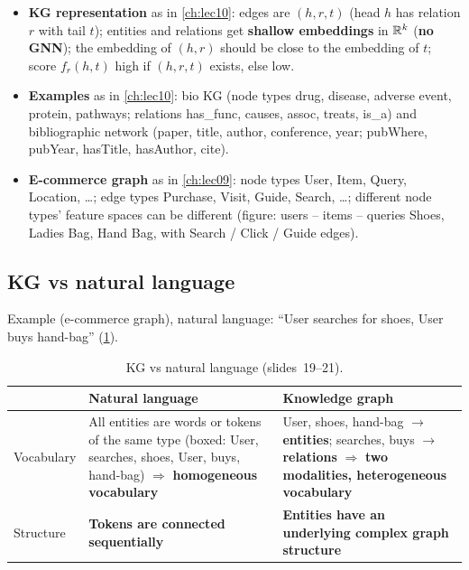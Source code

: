 \begin{itemize}
  \item \textbf{KG representation} as in \cref{ch:lec10}: edges are 
    $(h,r,t)$ (head $h$ has relation $r$ with tail $t$); entities and relations get
    \textbf{shallow embeddings} in $\mathbb{R}^k$ (\textbf{no GNN}); the embedding of $(h,r)$
    should be close to the embedding of $t$; score $f_r(h,t)$ high if $(h,r,t)$ exists,
    else low.
  \item \textbf{Examples} as in \cref{ch:lec10}: bio KG (node types drug, disease,
    adverse event, protein, pathways; relations has\_func, causes, assoc, treats, is\_a)
    and bibliographic network (paper, title, author, conference, year; pubWhere,
    pubYear, hasTitle, hasAuthor, cite).
  \item \textbf{E-commerce graph} as in \cref{ch:lec09}: node types User, Item, Query,
    Location, \dots; edge types Purchase, Visit, Guide, Search, \dots; different node
    types' feature spaces can be different (figure: users -- items -- queries Shoes,
    Ladies Bag, Hand Bag, with Search / Click / Guide edges).
\end{itemize}

\subsection{KG vs natural language}\label{sec:lec15-kgnl}

Example (e-commerce graph), natural language: ``User searches for shoes, User buys
hand-bag'' (\cref{tab:lec15-kgnl}).

\begin{table}[htbp]
  \centering\small
  \caption{KG vs natural language (slides~19--21).}
  \label{tab:lec15-kgnl}
  \renewcommand{\arraystretch}{1.2}
  \begin{tabularx}{\textwidth}{@{}l>{\raggedright\arraybackslash}X>{\raggedright\arraybackslash}X@{}}
    \toprule
     & Natural language & Knowledge graph\\
    \midrule
    Vocabulary & All entities are words or tokens of the same type (boxed: User,
      searches, shoes, User, buys, hand-bag) $\Rightarrow$ \textbf{homogeneous
      vocabulary}
      & User, shoes, hand-bag $\to$ \textbf{entities}; searches, buys $\to$
      \textbf{relations} $\Rightarrow$ \textbf{two modalities, heterogeneous
      vocabulary}\\
    Structure & \textbf{Tokens are connected sequentially}
      & \textbf{Entities have an underlying complex graph structure}\\
    \bottomrule
  \end{tabularx}
\end{table}

